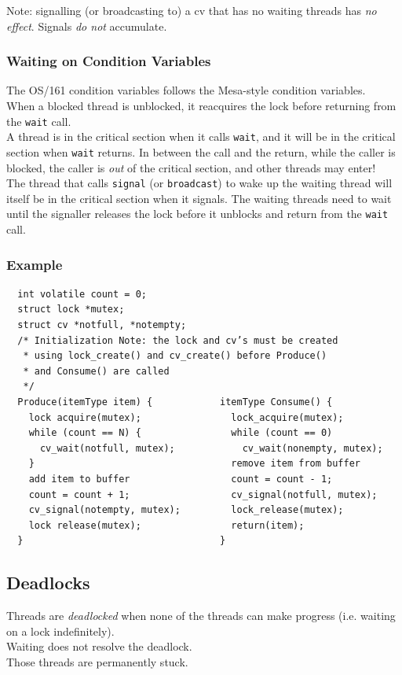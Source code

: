 \documentclass[12pt]{article}
\theoremstyle{plain}
\theoremstyle{definition}
\begin{document}
Note: signalling (or broadcasting to) a cv that has no waiting threads has \emph{no effect}.
Signals \emph{do not} accumulate.

\subsubsection{Waiting on Condition Variables}
The OS/161 condition variables follows the Mesa-style condition variables. \\
When a blocked thread is unblocked, it reacquires the lock before returning from the \texttt{wait} call. \\
A thread is in the critical section when it calls \texttt{wait}, and it will be in the critical section when \texttt{wait} returns.
In between the call and the return, while the caller is blocked, the caller is \emph{out} of the critical section, and other threads may enter! \\
The thread that calls \texttt{signal} (or \texttt{broadcast}) to wake up the waiting thread will itself be in the critical section when it signals.
The waiting threads need to wait until the signaller releases the lock before it unblocks and return from the \texttt{wait} call.

\subsubsection{Example}
\begin{verbatim}
  int volatile count = 0;
  struct lock *mutex;
  struct cv *notfull, *notempty;
  /* Initialization Note: the lock and cv’s must be created
   * using lock_create() and cv_create() before Produce()
   * and Consume() are called
   */
  Produce(itemType item) {            itemType Consume() {
    lock acquire(mutex);                lock_acquire(mutex);
    while (count == N) {                while (count == 0)
      cv_wait(notfull, mutex);            cv_wait(nonempty, mutex);
    }                                   remove item from buffer
    add item to buffer                  count = count - 1;
    count = count + 1;                  cv_signal(notfull, mutex);
    cv_signal(notempty, mutex);         lock_release(mutex);
    lock release(mutex);                return(item);
  }                                   }
\end{verbatim}

\subsection{Deadlocks}
Threads are \emph{deadlocked} when none of the threads can make progress (i.e. waiting on a lock indefinitely). \\
Waiting does not resolve the deadlock. \\
Those threads are permanently stuck.
\end{document}
